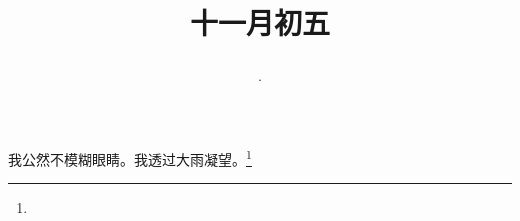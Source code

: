 \title{\date[d=5,m=12,y=2024][year:cn-y,年,month:cn,day:cn,日,·,weekday]·十一月初五 }
我公然不模糊眼睛。我透过大雨凝望。\footnote{ }

